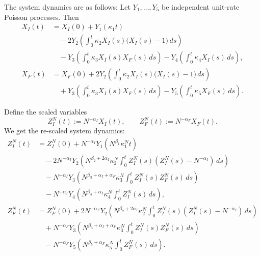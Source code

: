 \documentclass{article}
\begin{document}
The system dynamics are as follows:
Let $Y_1,\ldots,Y_5$ be independent unit-rate Poisson processes. Then
\begin{align*}
X_I(t)
&=X_I(0)
+Y_1\!\left(\kappa_1 t\right) \\
&\quad
-2Y_2\!\left(\int_0^t \kappa_2 X_I(s)\bigl(X_I(s)-1\bigr)\,ds\right) \\
&\quad
-Y_3\!\left(\int_0^t \kappa_3 X_I(s)X_F(s)\,ds\right)
-Y_4\!\left(\int_0^t \kappa_4 X_I(s)\,ds\right),
\\[1em]
X_F(t)
&=X_F(0)
+2Y_2\!\left(\int_0^t \kappa_2 X_I(s)\bigl(X_I(s)-1\bigr)\,ds\right) \\
&\quad
+Y_3\!\left(\int_0^t \kappa_3 X_I(s)X_F(s)\,ds\right)
-Y_5\!\left(\int_0^t \kappa_5 X_F(s)\,ds\right).
\end{align*}

Define the scaled variables
\[
Z_I^N(t):=N^{-\alpha_I}X_I(t),
\qquad
Z_F^N(t):=N^{-\alpha_F}X_F(t).
\]
We get the re-scaled system dynamics:
\begin{align*}
Z_I^N(t)
&=Z_I^N(0)
+N^{-\alpha_I}
Y_1\!\left(
N^{\beta_1}\kappa_1^N t
\right) \\
&\quad
-2N^{-\alpha_I}
Y_2\!\left(
N^{\beta_2+2\alpha_I}\kappa_2^N
\int_0^t Z_I^N(s)
\left(Z_I^N(s)-N^{-\alpha_I}\right)\,ds
\right) \\
&\quad
-N^{-\alpha_I}
Y_3\!\left(
N^{\beta_3+\alpha_I+\alpha_F}\kappa_3^N
\int_0^t Z_I^N(s)Z_F^N(s)\,ds
\right) \\
&\quad
-N^{-\alpha_I}
Y_4\!\left(
N^{\beta_4+\alpha_I}\kappa_4^N
\int_0^t Z_I^N(s)\,ds
\right),
\\[1em]
Z_F^N(t)
&=Z_F^N(0)
+2N^{-\alpha_F}
Y_2\!\left(
N^{\beta_2+2\alpha_I}\kappa_2^N
\int_0^t Z_I^N(s)
\left(Z_I^N(s)-N^{-\alpha_I}\right)\,ds
\right) \\
&\quad
+N^{-\alpha_F}
Y_3\!\left(
N^{\beta_3+\alpha_I+\alpha_F}\kappa_3^N
\int_0^t Z_I^N(s)Z_F^N(s)\,ds
\right) \\
&\quad
-N^{-\alpha_F}
Y_5\!\left(
N^{\beta_5+\alpha_F}\kappa_5^N
\int_0^t Z_F^N(s)\,ds
\right).
\end{align*}
\end{document}
